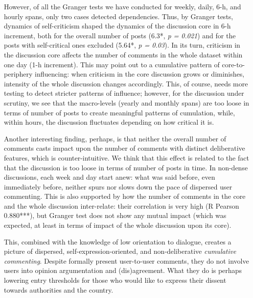 However, of all the Granger tests we have conducted for weekly, daily, 6-h, and hourly spans, only two cases detected dependencies. Thus, by Granger tests, dynamics of self-criticism shaped the dynamics of the discussion core in 6-h increment, both for the overall number of posts (6.3*, \textit{p = 0.021}) and for the posts with self-critical ones excluded (5.64*, \textit{p = 0.03}). In its turn, criticism in the discussion core affects the number of comments in the whole dataset within one day (1-h increment). This may point out to a cumulative pattern of core-to-periphery influencing: when criticism in the core discussion grows or diminishes, intensity of the whole discussion changes accordingly. This, of course, needs more testing to detect stricter patterns of influence; however, for the discussion under scrutiny, we see that the macro-levels (yearly and monthly spans) are too loose in terms of number of posts to create meaningful patterns of cumulation, while, within hours, the discussion fluctuates depending on how critical it is.

Another interesting finding, perhaps, is that neither the overall number of comments casts impact upon the number of comments with distinct deliberative features, which is counter-intuitive. We think that this effect is related to the fact that the discussion is too loose in terms of number of posts in time. In non-dense discussions, each week and day start anew: what was said before, even immediately before, neither spurs nor slows down the pace of dispersed user commenting. This is also supported by how the number of comments in the core and the whole discussion inter-relate: their correlation is very high (R Pearson 0.880***), but Granger test does not show any mutual impact (which was expected, at least in terms of impact of the whole discussion upon its core).

This, combined with the knowledge of low orientation to dialogue, creates a picture of dispersed, self-expression-oriented, and non-deliberative \textit{cumulative commenting}. Despite formally present user-to-user comments, they do not involve users into opinion argumentation and (dis)agreement. What they do is perhaps lowering entry thresholds for those who would like to express their dissent towards authorities and the country.

